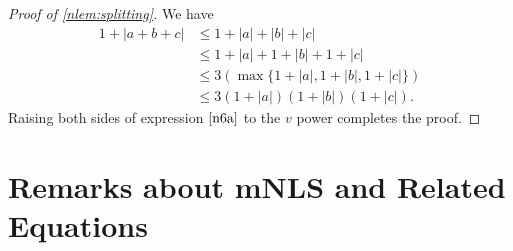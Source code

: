 %
%
\begin{proof}[Proof of \cref{nlem:splitting}] We have
%
%
\begin{equation}
	\label{n6a}
	\begin{split}
		1 + | a + b + c| 
		& \le 1 + | a | + | b | + | c |
		\\
		& \le 1 + | a | + 1 + | b | + 1 + | c |
		\\
		& \le 3\left( \max\{1+| a |, 1+| b |, 1+ | c | \}\right)
		\\
		& \le 3 \left( 1 + | a | \right)\left( 1 + | b | \right) \left( 1 + |
		c |
		\right).
	\end{split}
\end{equation}
%
%
Raising both sides of expression $\eqref{n6a}$ to the $v$ power completes 
the proof. 
\end{proof}
%
%
%
\section{Remarks about mNLS and Related Equations}
%
